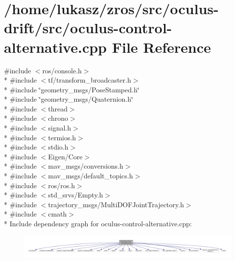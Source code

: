 \hypertarget{oculus-control-alternative_8cpp}{}\section{/home/lukasz/zros/src/oculus-\/drift/src/oculus-\/control-\/alternative.cpp File Reference}
\label{oculus-control-alternative_8cpp}
{\ttfamily \#include $<$ros/console.\+h$>$}\\*
{\ttfamily \#include $<$tf/transform\+\_\+broadcaster.\+h$>$}\\*
{\ttfamily \#include \char`\"{}geometry\+\_\+msgs/\+Pose\+Stamped.\+h\char`\"{}}\\*
{\ttfamily \#include \char`\"{}geometry\+\_\+msgs/\+Quaternion.\+h\char`\"{}}\\*
{\ttfamily \#include $<$thread$>$}\\*
{\ttfamily \#include $<$chrono$>$}\\*
{\ttfamily \#include $<$signal.\+h$>$}\\*
{\ttfamily \#include $<$termios.\+h$>$}\\*
{\ttfamily \#include $<$stdio.\+h$>$}\\*
{\ttfamily \#include $<$Eigen/\+Core$>$}\\*
{\ttfamily \#include $<$mav\+\_\+msgs/conversions.\+h$>$}\\*
{\ttfamily \#include $<$mav\+\_\+msgs/default\+\_\+topics.\+h$>$}\\*
{\ttfamily \#include $<$ros/ros.\+h$>$}\\*
{\ttfamily \#include $<$std\+\_\+srvs/\+Empty.\+h$>$}\\*
{\ttfamily \#include $<$trajectory\+\_\+msgs/\+Multi\+D\+O\+F\+Joint\+Trajectory.\+h$>$}\\*
{\ttfamily \#include $<$cmath$>$}\\*
Include dependency graph for oculus-\/control-\/alternative.cpp\+:\nopagebreak
\begin{figure}[H]
\begin{center}
\leavevmode
\includegraphics[width=350pt]{oculus-control-alternative_8cpp__incl}
\end{center}
\end{figure}
